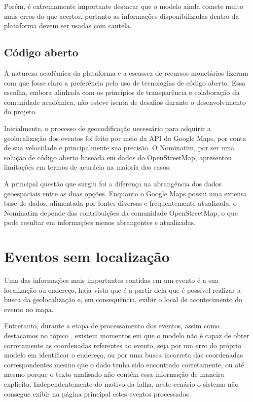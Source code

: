 Porém, é extremamente importante destacar que o modelo ainda comete muito mais
erros do que acertos, portanto as informações disponibilizadas dentro da
plataforma devem ser usadas com cautela.

\subsection{Código aberto}

A natureza acadêmica da plataforma e a escassez de recursos monetários fizeram
com que fosse claro a preferência pelo uso de tecnologias de código aberto.
Essa escolha, embora alinhada com os princípios de transparência e colaboração
da comunidade acadêmica, não esteve isenta de desafios durante o
desenvolvimento do projeto.

Inicialmente, o processo de geocodificação necessário para adquirir a
geolocalização dos eventos foi feito por meio da \acs{API} do Google Maps, por
conta de sua velocidade e principalmente sua precisão. O Nominatim, por ser uma
solução de código aberto baseada em dados do OpenStreetMap, apresentou
limitações em termos de acurácia na maioria dos casos.

A principal questão que surgiu foi a diferença na abrangência dos dados
geoespaciais entre as duas opções. Enquanto o Google Maps possui uma extensa
base de dados, alimentada por fontes diversas e frequentemente atualizada, o
Nominatim depende das contribuições da comunidade OpenStreetMap, o que pode
resultar em informações menos abrangentes e atualizadas.

\section{Eventos sem localização}

Uma das informações mais importantes contidas em um evento é a sua localização
ou endereço, haja vista que é a partir dela que é possível realizar a busca da
geolocalização e, em consequência, exibir o local de acontecimento do evento no
mapa.

Entretanto, durante a etapa de processamento dos eventos, assim como destacamos
no tópico , existem momentos em que o modelo não é
capaz de obter corretamente as coordenadas referentes ao evento, seja por um
erro do próprio modelo em identificar o endereço, ou por uma busca incorreta
das coordenadas correspondentes mesmo que o dado tenha sido encontrado
corretamente, ou até mesmo porque o texto analisado não contém essa informação
de maneira explícita. Independentemente do motivo da falha, neste cenário o
sistema não consegue exibir na página principal estes eventos processados.

